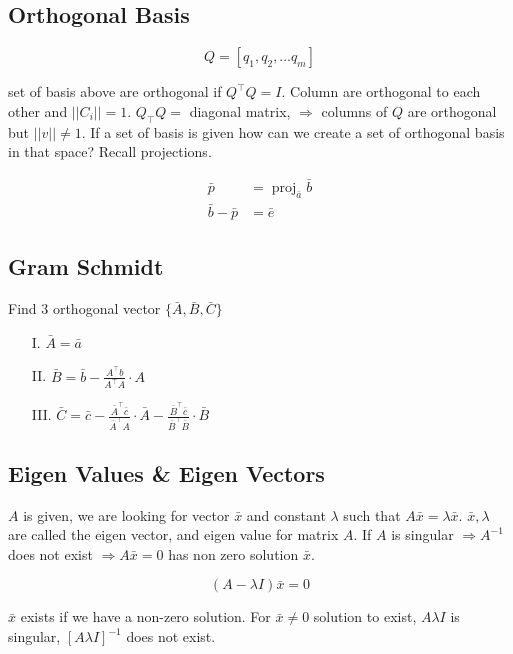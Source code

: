 \documentclass[main.tex]{subfiles}
\begin{document}
\subsection{Orthogonal Basis}

    $$
    Q=\left[q_{1}, q_{2}, \ldots q_{m}\right]
    $$
    
    set of basis above are orthogonal if $Q^{\top} Q=I$. Column are orthogonal to each other and $|| C_{i} ||=1$. $Q_{\top} Q= $ diagonal matrix, $\Rightarrow$ columns of $Q$ are orthogonal but $|| v || \neq 1$. If a set of basis is given how can we create a set of orthogonal basis in that space? Recall projections.
    
    $$
    \begin{aligned}
    \bar{p}&=\operatorname{proj}_{\bar{a}}\bar{b} \\
    \bar{b}-\bar{p}&=\bar{e}
    \end{aligned}
    $$ 

\subsection{Gram Schmidt}

    Find 3 orthogonal vector $\{\bar{A}, \bar{B}, \bar{C}\}$
    
    \begin{enumerate}
        \item[I.] $\bar{A}=\bar{a}$
        \item[II.] $\bar{B}=\bar{b}-\frac{A^{\top} b}{A^{\top} A} \cdot A$
        \item[III.] $\bar{C}=\bar{c}-\frac{\bar{A}^{\top} \bar{c}}{\bar{A}^{\top} A} \cdot \bar{A}-\frac{\bar{B}^{\top} \bar{c}}{\bar{B}^{\top} \bar{B}} \cdot \bar{B}$
    \end{enumerate}

\subsection{Eigen Values & Eigen Vectors}

    $A$ is given, we are looking for vector $\bar{x}$ and constant $\lambda$ such that $A \bar{x}=\lambda \bar{x}$. $\bar{x}, \lambda$ are called the eigen vector, and eigen value for matrix $A$. If $A$ is singular $\Rightarrow A^{-1}$ does not exist $\Rightarrow A \bar{x}=0$ has non zero solution $\bar{x}$.
    
    $$(A - \lambda I) \bar{x}=0$$
    
    $\bar{x}$ exists if we have a non-zero solution. For $\bar{x} \neq 0$ solution to exist, $A \lambda I$ is singular, $[A \lambda I]^{-1}$ does not exist.
    
\end{document}
